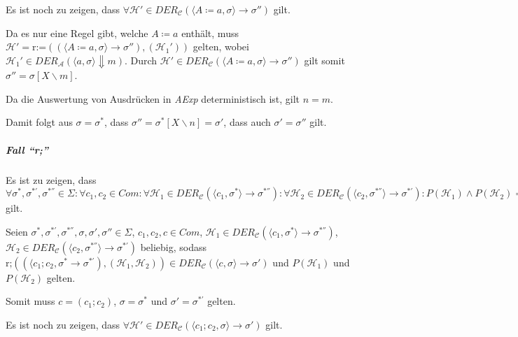 					Es ist noch zu zeigen, dass $ \forall \mathcal{H}' \in \textit{DER} _ \mathcal{C} (\langle A \coloneqq a, \sigma \rangle \rightarrow \sigma'') $ gilt.

					Da es nur eine Regel gibt, welche $ A \coloneqq a $ enthält, muss $ \mathcal{H}' = \text{r:=}((\langle A \coloneqq a, \sigma \rangle \rightarrow \sigma''), (\mathcal{H} _ 1 ')) $ gelten, wobei $ \mathcal{H} _ 1 ' \in \textit{DER} _ \mathcal{A} (\langle a, \sigma \rangle \Downarrow m) $. Durch $ \mathcal{H}' \in \textit{DER} _ \mathcal{C} (\langle A \coloneqq a, \sigma \rangle \rightarrow \sigma'') $ gilt somit $ \sigma'' = \sigma[X \backslash m] $.

					Da die Auswertung von Ausdrücken in \textit{AExp} deterministisch ist, gilt $ n = m $.

					Damit folgt aus $ \sigma = \sigma ^ * $, dass $ \sigma'' = \sigma ^ * [X \backslash n] = \sigma' $, dass auch $ \sigma' = \sigma'' $ gilt.

				\subparagraph{Fall \enquote{r;}}
					Es ist zu zeigen, dass $ \forall \sigma ^ *, \sigma ^ {*'}, \sigma ^ {*''} \in \Sigma : \forall c _ 1, c _ 2 \in \textit{Com} : \forall \mathcal{H} _ 1 \in \textit{DER} _ \mathcal{C} (\langle c _ 1, \sigma ^ * \rangle \rightarrow \sigma ^ {*''}) : \forall \mathcal{H} _ 2 \in \textit{DER} _ \mathcal{C} (\langle c _ 2, \sigma ^ {*''} \rangle \rightarrow \sigma ^ {*'}) : P(\mathcal{H} _ 1) \land P(\mathcal{H} _ 2) \implies P(\text{r;}((\langle c _ 1 ; c _ 2, \sigma ^ * \rangle \rightarrow \sigma ^ {*'}), (\mathcal{H} _ 1, \mathcal{H} _ 2))) $ gilt.

					Seien $ \sigma ^ *, \sigma ^ {*'}, \sigma ^ {*''}, \sigma, \sigma', \sigma'' \in \Sigma $, $ c _ 1, c _ 2, c \in \textit{Com} $, $ \mathcal{H} _ 1 \in \textit{DER} _ \mathcal{C} (\langle c _ 1, \sigma ^ * \rangle \rightarrow \sigma ^ {*''}) $, $ \mathcal{H} _ 2 \in \textit{DER} _ \mathcal{C} (\langle c _ 2, \sigma ^ {*''} \rangle \rightarrow \sigma ^ {*'}) $ beliebig, sodass $ \text{r;}((\langle c _ 1 ; c _ 2, \sigma ^ * \rightarrow \sigma ^ {*'}), (\mathcal{H} _ 1, \mathcal{H} _ 2)) \in \textit{DER} _ \mathcal{C} (\langle c, \sigma \rangle \rightarrow \sigma') $ und $ P(\mathcal{H} _ 1) $ und $ P(\mathcal{H} _ 2) $ gelten.

					Somit muss $ c = (c _ 1 ; c _ 2) $, $ \sigma = \sigma ^ * $ und $ \sigma' = \sigma ^ {*'} $ gelten.

					Es ist noch zu zeigen, dass $ \forall \mathcal{H}' \in \textit{DER} _ \mathcal{C} (\langle c _ 1 ; c _ 2, \sigma \rangle \rightarrow \sigma') $ gilt.

